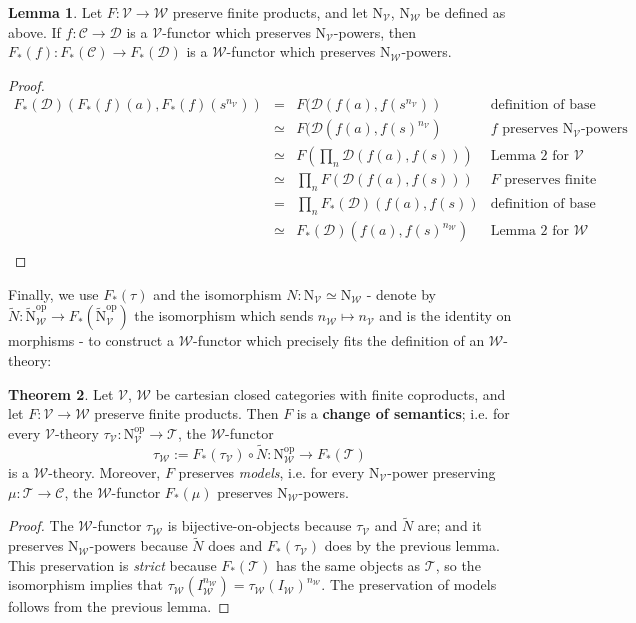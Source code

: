 \documentclass[a4paper,UKenglish]{article}
\theoremstyle{definition}
\newtheorem{theorem}{Theorem}
\newtheorem{lemma}[theorem]{Lemma}
\newcommand{\op}{\mathrm{op}}
\newcommand{\NN}{\mathrm{N}}
\newcommand{\V}{\mathscr{V}}
\newcommand{\W}{\mathscr{W}}
\newcommand{\D}{\mathscr{D}}
\newcommand{\C}{\mathscr{C}}
\newcommand{\T}{\mathscr{T}}
\begin{document}
\begin{lemma}
	Let $F: \V \to \W$ preserve finite products, and let $\NN_\V$, $\NN_\W$ be defined as above. If $f: \C \to \D$ is a $\V$-functor which preserves $\NN_\V$-powers, then $F_*(f):F_*(\C)\to F_*(\D)$ is a $\W$-functor which preserves $\NN_\W$-powers.
\end{lemma}
\begin{proof}
	\[\begin{array}{rcll}
	F_*(\D)(F_*(f)(a),F_*(f)(s^{n_\V})) & = & F(\D(f(a),f(s^{n_\V})) & \text{definition of base change}\\
	& \simeq & F(\D(f(a),f(s)^{n_\V}) & f \text{ preserves } \NN_\V \text{-powers}\\
	& \simeq & F(\prod_n \D(f(a),f(s))) & \text{Lemma 2 for } \V\\
	& \simeq & \prod_n F(\D(f(a),f(s))) & F \text{ preserves finite products}\\
	& = & \prod_n F_*(\D)(f(a),f(s)) & \text{definition of base change}\\
	& \simeq & F_*(\D)(f(a),f(s)^{n_\W}) & \text{Lemma 2 for } \W\\
	\end{array}\]
\end{proof}

Finally, we use $F_*(\tau)$ and the isomorphism $N: \NN_\V \simeq \NN_\W$ - denote by $\tilde{N}: \tilde{\NN}_\W^\op \to F_*(\tilde{\NN}_\V^\op)$ the isomorphism which sends $n_\W \mapsto n_\V$ and is the identity on morphisms - to construct a $\W$-functor which precisely fits the definition of an $\W$-theory:

\begin{theorem}
	Let $\V$, $\W$ be cartesian closed categories with finite coproducts, and let $F: \V \to \W$ preserve finite products. Then $F$ is a \textbf{change of semantics}; i.e. for every $\V$-theory $\tau_\V: \NN_\V^\op \to \T$, the $\W$-functor $$\tau_\W := F_*(\tau_\V) \circ \tilde{N}: \NN_\W^\op \to F_*(\T)$$ is a $\W$-theory. Moreover, $F$ preserves \textit{models}, i.e. for every $\NN_\V$-power preserving $\mu:\T \to \C$, the $\W$-functor $F_*(\mu)$ preserves $\NN_\W$-powers.
\end{theorem}
\begin{proof}
	The $\W$-functor $\tau_\W$ is bijective-on-objects because $\tau_\V$ and $\tilde{N}$ are; and it preserves $\NN_\W$-powers because $\tilde{N}$ does and $F_*(\tau_\V)$ does by the previous lemma. This preservation is \textit{strict} because $F_*(\T)$ has the same objects as $\T$, so the isomorphism implies that $\tau_\W(I_\W^{n_\W}) = \tau_\W(I_\W)^{n_\W}$. The preservation of models follows from the previous lemma.
\end{proof}
\end{document}
